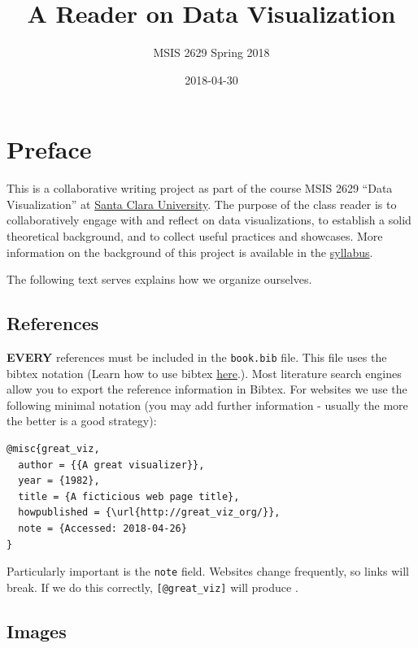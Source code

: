 \documentclass[]{book}
\title{A Reader on Data Visualization}
\author{MSIS 2629 Spring 2018}
\date{2018-04-30}
\theoremstyle{definition}
\theoremstyle{definition}
\theoremstyle{definition}
\theoremstyle{remark}
\begin{document}
\maketitle

{
\setcounter{tocdepth}{1}
\tableofcontents
}
\chapter{Preface}\label{preface}

This is a collaborative writing project as part of the course MSIS 2629
``Data Visualization'' at \href{http://www.scu.edu}{Santa Clara
University}. The purpose of the class reader is to collaboratively
engage with and reflect on data visualizations, to establish a solid
theoretical background, and to collect useful practices and showcases.
More information on the background of this project is available in the
\href{https://mschermann.github.io/msis2629spring2018}{syllabus}.

The following text serves explains how we organize ourselves.

\section{References}\label{references}

\textbf{EVERY} references must be included in the \texttt{book.bib}
file. This file uses the bibtex notation (Learn how to use bibtex
\href{http://www.bibtex.org/Using/}{here}.). Most literature search
engines allow you to export the reference information in Bibtex. For
websites we use the following minimal notation (you may add further
information - usually the more the better is a good strategy):

\begin{verbatim}
@misc{great_viz,
  author = {{A great visualizer}},
  year = {1982},
  title = {A ficticious web page title},
  howpublished = {\url{http://great_viz_org/}},
  note = {Accessed: 2018-04-26}
}
\end{verbatim}

Particularly important is the \texttt{note} field. Websites change
frequently, so links will break. If we do this correctly,
\texttt{{[}@great\_viz{]}} will produce \citep{great_viz}.

\section{Images}\label{images}
\end{document}
